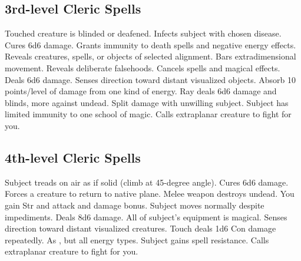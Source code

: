 \subsection{3rd-level Cleric Spells}
\begin{spelllist}
   Touched creature is blinded or deafened.
   Infects subject with chosen disease.
   Cures 6d6 damage.
   Grants immunity to death spells and negative energy effects.
   Reveals creatures, spells, or objects of selected alignment.
   Bars extradimensional movement.
   Reveals deliberate falsehoods.
   Cancels spells and magical effects.
   Deals 6d6 damage.
   Senses direction toward distant visualized objects.
   Absorb 10 points/level of damage from one kind of energy.
   Ray deals 6d6 damage and blinds, more against undead.
    Split damage with unwilling subject.
   Subject has limited immunity to one school of magic. 
   Calls extraplanar creature to fight for you.
\end{spelllist}

\subsection{4th-level Cleric Spells}
\begin{spelllist}
   Subject treads on air as if solid (climb at 45-degree angle).
   Cures 6d6 damage.
   Forces a creature to return to native plane.
   Melee weapon destroys undead.
   You gain  Str and attack and damage bonus.
   Subject moves normally despite impediments.
   Deals 8d6 damage.
   All of subject's equipment is magical.
   Senses direction toward distant visualized creatures.
   Touch deals 1d6 Con damage repeatedly.
   As , but all energy types.
   Subject gains spell resistance.
   Calls extraplanar creature to fight for you.
\end{spelllist}

